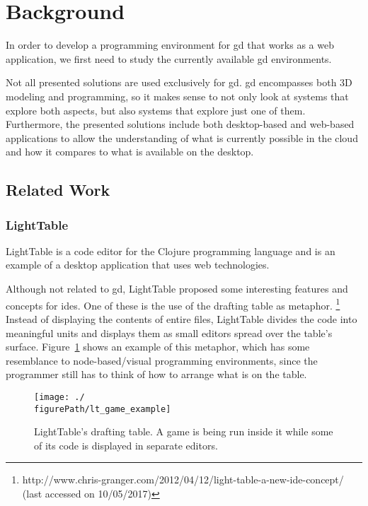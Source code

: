 
\section{Background}
\label{sec:background}
In order to develop a programming environment for \gls{gd} that works as a web application, we first need to study the currently available \gls{gd} environments.

Not all presented solutions are used exclusively for \gls{gd}.
\gls{gd} encompasses both 3D modeling and programming, so it makes sense to not only look at systems that explore both aspects, but also systems that explore just one of them.
Furthermore, the presented solutions include both desktop-based and web-based applications to allow the understanding of what is currently possible in the cloud and how it compares to what is available on the desktop.


\subsection{Related Work}
\subsubsection{LightTable}
\label{lighttable:related}
LightTable\cite{lighttable2015site} is a code editor for the Clojure programming language\cite{hickey2008clojure} and is an example of a desktop application that uses web technologies.

Although not related to \gls{gd}, LightTable proposed some interesting features and concepts for \glspl{ide}.
One of these is the use of the drafting table as metaphor.%
\footnote{http://www.chris-granger.com/2012/04/12/light-table-a-new-ide-concept/ (last accessed on 10/05/2017)}
Instead of displaying the contents of entire files, LightTable divides the code into meaningful units and displays them as small editors spread over the table's surface.
Figure~\ref{fig:lt:draft:table} shows an example of this metaphor, which has some resemblance to node-based/visual programming environments, since the programmer still has to think of how to arrange what is on the table.

\begin{figure}
  \centering
  \texttt{[image: ./\\figurePath/lt\_game\_example]}
  \caption[LightTable's drafting table showing a game.]{LightTable's drafting table. A game is being run inside it while some of its code is displayed in separate editors.}
  \label{fig:lt:draft:table}
\end{figure}

